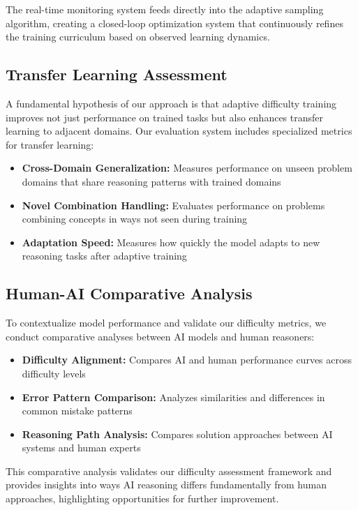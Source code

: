The real-time monitoring system feeds directly into the adaptive sampling algorithm, creating a closed-loop optimization system that continuously refines the training curriculum based on observed learning dynamics.

\subsection{Transfer Learning Assessment}

A fundamental hypothesis of our approach is that adaptive difficulty training improves not just performance on trained tasks but also enhances transfer learning to adjacent domains. Our evaluation system includes specialized metrics for transfer learning:

\begin{itemize}
    \item \textbf{Cross-Domain Generalization:} Measures performance on unseen problem domains that share reasoning patterns with trained domains
    \item \textbf{Novel Combination Handling:} Evaluates performance on problems combining concepts in ways not seen during training
    \item \textbf{Adaptation Speed:} Measures how quickly the model adapts to new reasoning tasks after adaptive training
\end{itemize}

\subsection{Human-AI Comparative Analysis}

To contextualize model performance and validate our difficulty metrics, we conduct comparative analyses between AI models and human reasoners:

\begin{itemize}
    \item \textbf{Difficulty Alignment:} Compares AI and human performance curves across difficulty levels
    \item \textbf{Error Pattern Comparison:} Analyzes similarities and differences in common mistake patterns
    \item \textbf{Reasoning Path Analysis:} Compares solution approaches between AI systems and human experts
\end{itemize}

This comparative analysis validates our difficulty assessment framework and provides insights into ways AI reasoning differs fundamentally from human approaches, highlighting opportunities for further improvement.
